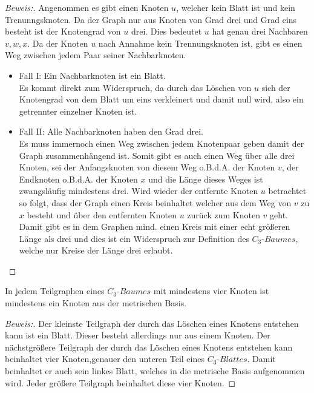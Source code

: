 \begin{proof}[Beweis:]
Angenommen es gibt einen Knoten $u$, welcher kein Blatt ist und kein Trenunngsknoten. Da der Graph nur aus Knoten von Grad drei und Grad eins besteht ist der Knotengrad von $u$ drei. Dies bedeutet $u$ hat genau drei Nachbaren $v,w,x$. Da
der Knoten $u$ nach Annahme kein Trennungsknoten ist, gibt es einen Weg zwischen jedem Paar seiner Nachbarknoten.
\begin{itemize}
\item Fall I: Ein Nachbarknoten ist ein Blatt.\\ Es kommt direkt zum Widerspruch, da durch das Löschen von $u$ sich der Knotengrad von dem Blatt um eins verkleinert und damit null wird, also ein getrennter einzelner Knoten ist.
\item Fall II: Alle Nachbarknoten haben den Grad drei.\\
Es muss immernoch einen Weg zwischen jedem Knotenpaar geben damit der Graph zusammenhängend ist. Somit gibt es auch einen Weg über alle drei Knoten, sei der Anfangsknoten von diesem Weg o.B.d.A. der Knoten $v$, der Endknoten o.B.d.A. der Knoten $x$ und die Länge dieses Weges ist zwangsläufig mindestens drei. Wird wieder der entfernte Knoten $u$ betrachtet so folgt, dass der Graph einen Kreis beinhaltet welcher aus dem Weg von $v$ zu $x$ besteht und über den entfernten Knoten $u$ zurück zum Knoten $v$ geht.\\
Damit gibt es in dem Graphen mind. einen Kreis mit einer echt größeren Länge als drei und dies ist ein Widerspruch zur Definition des $C_{3}$-$Baumes$, welche nur Kreise der Länge drei erlaubt.
\end{itemize}
\end{proof}
\begin{lem}
\label{bkb2}
In jedem Teilgraphen eines $C_{3}$-$Baumes$ mit mindestens vier Knoten ist mindestens ein Knoten aus der metrischen Basis.
\end{lem}
\begin{proof}[Beweis:]
Der kleinste Teilgraph der durch das Löschen eines Knotens entstehen kann ist ein Blatt. Dieser besteht allerdings nur aus einem Knoten. Der nächstgrößere Teilgraph der durch das Löschen eines Knotens entstehen kann beinhaltet vier Knoten,genauer den unteren Teil eines $C_{3}$-$Blattes$. Damit beinhaltet er auch sein linkes Blatt, welches in die metrische Basis aufgenommen wird. Jeder größere Teilgraph beinhaltet diese vier Knoten. %
\end{proof}
